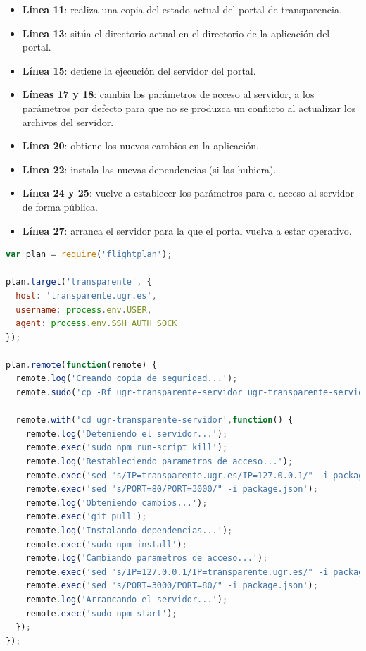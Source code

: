 \begin{itemize}
	\item \textbf{Línea 11}: realiza una copia del estado actual del portal de transparencia.
	\item \textbf{Línea 13}: sitúa el directorio actual en el directorio de la aplicación del portal.
	\item \textbf{Línea 15}: detiene la ejecución del servidor del portal.
	\item \textbf{Líneas 17 y 18}: cambia los parámetros de acceso al servidor, a los parámetros por defecto para que no se produzca un conflicto al actualizar los archivos del servidor.
	\item \textbf{Línea 20}: obtiene los nuevos cambios en la aplicación.
	\item \textbf{Línea 22}: instala las nuevas dependencias (si las hubiera).
	\item \textbf{Línea 24 y 25}: vuelve a establecer los parámetros para el acceso al servidor de forma pública.
	\item \textbf{Línea 27}: arranca el servidor para la que el portal vuelva a estar operativo.
\end{itemize}

\begin{lstlisting}[language=javascript,caption={Archivo flightplan.js},label={lst:testjs}]
var plan = require('flightplan');

plan.target('transparente', {
  host: 'transparente.ugr.es',
  username: process.env.USER,
  agent: process.env.SSH_AUTH_SOCK
});

plan.remote(function(remote) {
  remote.log('Creando copia de seguridad...');
  remote.sudo('cp -Rf ugr-transparente-servidor ugr-transparente-servidor.bak', {user: process.env.USER});

  remote.with('cd ugr-transparente-servidor',function() {
    remote.log('Deteniendo el servidor...');
    remote.exec('sudo npm run-script kill');
    remote.log('Restableciendo parametros de acceso...');
    remote.exec('sed "s/IP=transparente.ugr.es/IP=127.0.0.1/" -i package.json');
    remote.exec('sed "s/PORT=80/PORT=3000/" -i package.json');
    remote.log('Obteniendo cambios...');
    remote.exec('git pull');
    remote.log('Instalando dependencias...');
    remote.exec('sudo npm install');
    remote.log('Cambiando parametros de acceso...');
    remote.exec('sed "s/IP=127.0.0.1/IP=transparente.ugr.es/" -i package.json');
    remote.exec('sed "s/PORT=3000/PORT=80/" -i package.json');
    remote.log('Arrancando el servidor...');
    remote.exec('sudo npm start');
  });
});
\end{lstlisting}

